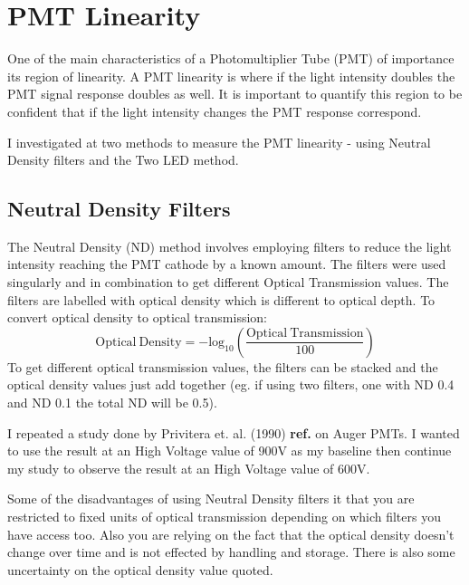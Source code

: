 \section{PMT Linearity}

One of the main characteristics of a Photomultiplier Tube (PMT) of importance its region of linearity. A PMT linearity is where if the light intensity doubles the PMT signal response doubles as well. It is important to quantify this region to be confident that if the light intensity changes the PMT response correspond.

I investigated at two methods to measure the PMT linearity - using Neutral Density filters and the Two LED method.

\subsection{Neutral Density Filters}

The Neutral Density (ND) method involves employing filters to reduce the light intensity reaching the PMT cathode by a known amount. The filters were used singularly and in combination to get different Optical Transmission values. The filters are labelled with optical density which is different to optical depth. To convert optical density to optical transmission:
\begin{equation}
\mathrm{Optical \ Density} = - \mathrm{log}_{10}\left(\frac{\mathrm{Optical \ Transmission}}{100} \right)
\end{equation}
To get different optical transmission values, the filters can be stacked and the optical density values just add together (eg. if using two filters, one with ND 0.4 and ND 0.1 the total ND will be 0.5).

I repeated a study done by Privitera et. al. (1990) \textbf{ref.} on Auger PMTs. I wanted to use the result at an High Voltage value of 900V as my baseline then continue my study to observe the result at an High Voltage value of 600V.

Some of the disadvantages of using Neutral Density filters it that you are restricted to fixed units of optical transmission depending on which filters you have access too. Also you are relying on the fact that the optical density doesn't change over time and is not effected by handling and storage. There is also some uncertainty on the optical density value quoted.

